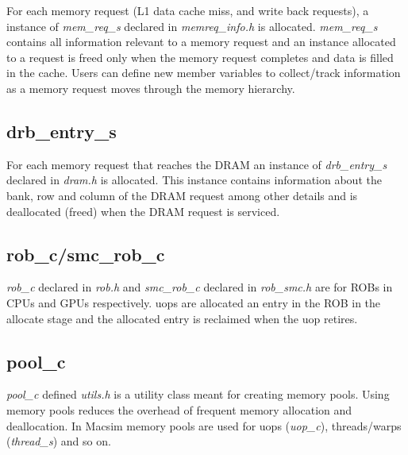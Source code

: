 For each memory request (L1 data cache miss, and write back requests), a
instance of \textit{mem\_req\_s} declared in \textit{memreq\_info.h} is
allocated. \textit{mem\_req\_s} contains all information relevant to a memory
request and an instance allocated to a request is freed only when the memory
request completes and data is filled in the cache. Users can define new member
variables to collect/track information as a memory request moves through the
memory hierarchy.

\subsection{drb\_entry\_s}

For each memory request that reaches the DRAM an instance of
\textit{drb\_entry\_s} declared in \textit{dram.h} is allocated. This instance
contains information about the bank, row and column of the DRAM request among
other details and is deallocated (freed) when the DRAM request is serviced.

\subsection{rob\_c/smc\_rob\_c}

\textit{rob\_c} declared in \textit{rob.h} and \textit{smc\_rob\_c} declared in
\textit{rob\_smc.h} are for ROBs in CPUs and GPUs respectively. uops are
allocated an entry in the ROB in the allocate stage and the allocated entry is
reclaimed when the uop retires.

\subsection{pool\_c}

\textit{pool\_c} defined \textit{utils.h} is a utility class meant for creating
memory pools. Using memory pools reduces the overhead of frequent memory
allocation and deallocation. In Macsim memory pools are used for uops
(\textit{uop\_c}), threads/warps (\textit{thread\_s}) and so on.

